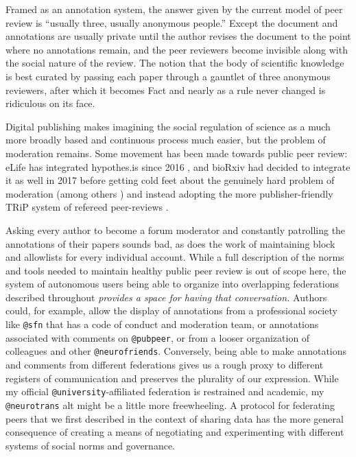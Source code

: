 \documentclass[10pt]{article}
\begin{document}
\begin{multicols}{2}
Framed as an annotation system, the answer given by the current model of
peer review is ``usually three, usually anonymous people.'' Except the
document and annotations are usually private until the author revises
the document to the point where no annotations remain, and the peer
reviewers become invisible along with the social nature of the review.
The notion that the body of scientific knowledge is best curated by
passing each paper through a gauntlet of three anonymous reviewers,
after which it becomes Fact and nearly as a rule never changed is
ridiculous on its face.

Digital publishing makes imagining the social regulation of science as a
much more broadly based and continuous process much easier, but the
problem of moderation remains. Some movement has been made towards
public peer review: eLife has integrated hypothes.is since 2016 \cite{ELifePartnersHypothes2016} , and bioRxiv had decided to
integrate it as well in 2017 \cite{dwhlyBioRxivSelectsHypothesis2017}  before getting cold feet about the genuinely hard problem of
moderation (among others \cite{heatherstainesPreprintServicesGather2018} ) and instead adopting the
more publisher-friendly TRiP system of refereed peer-reviews \cite{nateangellAnnouncingTRiPTransparent2019} .

Asking every author to become a forum moderator and constantly
patrolling the annotations of their papers sounds bad, as does the work
of maintaining block and allowlists for every individual account. While
a full description of the norms and tools needed to maintain healthy
public peer review is out of scope here, the system of autonomous users
being able to organize into overlapping federations described throughout
\emph{provides a space for having that conversation.} Authors could, for
example, allow the display of annotations from a professional society
like \texttt{@sfn} that has a code of conduct and moderation team, or
annotations associated with comments on \texttt{@pubpeer}, or from a
looser organization of colleagues and other \texttt{@neurofriends}.
Conversely, being able to make annotations and comments from different
federations gives us a rough proxy to different registers of
communication and preserves the plurality of our expression. While my
official \texttt{@university}-affiliated federation is restrained and
academic, my \texttt{@neurotrans} alt might be a little more
freewheeling. A protocol for federating peers that we first described in
the context of sharing data has the more general consequence of creating
a means of negotiating and experimenting with different systems of
social norms and governance.


\end{multicols}
\end{document}
